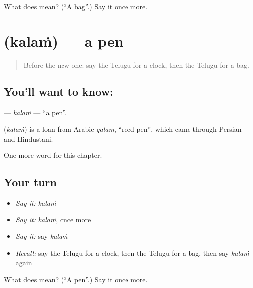 \begin{tcolorbox}[breakable,colback=teal!4,colframe=teal!35!black,title={Before you move on}]
What does  mean? (\textquotedblleft{}A bag\textquotedblright{}.) Say it once more.
\end{tcolorbox}
\section[\texorpdfstring{\te{కలం} (kalaṁ)}{కలం (kalaṁ)}]{ (kalaṁ) — a pen}

\label{lesson:TE-C112-kalam}



\begin{quote}
Before the new one: say the Telugu for a clock, then the Telugu for a bag.
\end{quote}

\subsection*{You'll want to know: }
\textbf{} — \emph{kalaṁ} — \textquotedblleft{}a pen\textquotedblright{}.

\begin{cousinweb}
\textbf{} (\emph{kalaṁ}) is a loan from Arabic \emph{qalam}, \textquotedblleft{}reed pen\textquotedblright{}, which came through Persian and Hindustani.
\end{cousinweb}

\begin{grammarlens}[title={What you've built}]
One more word for this chapter.
\end{grammarlens}

\subsection*{Your turn}
\begin{itemize}
\raggedright
  \item \emph{Say it:} \emph{kalaṁ}
  \item \emph{Say it:} \emph{kalaṁ}, once more
  \item \emph{Say it:} say \emph{kalaṁ}
  \item \emph{Recall:} say the Telugu for a clock, then the Telugu for a bag, then say \emph{kalaṁ} again
\end{itemize}

\begin{tcolorbox}[breakable,colback=teal!4,colframe=teal!35!black,title={Before you move on}]
What does  mean? (\textquotedblleft{}A pen\textquotedblright{}.) Say it once more.
\end{tcolorbox}
